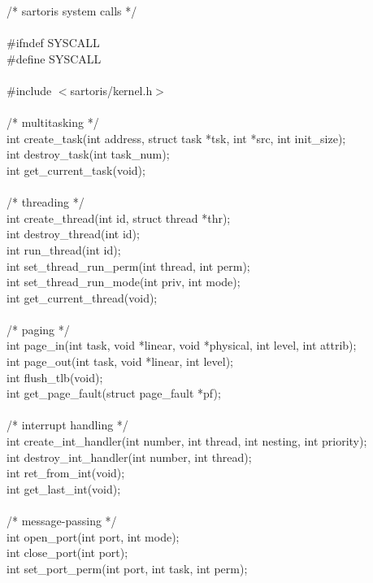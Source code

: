\documentclass[11pt, letterpaper, twoside, english]{book}
\begin{document}
\begin{sf}
\noindent /* sartoris system calls */ \\
\\
\#ifndef SYSCALL \\ 
\#define SYSCALL \\
\\
\#include $<$sartoris/kernel.h$>$ \\
\\
/* multitasking */ \\
int create\_task(int address, struct task *tsk, int *src, int init\_size); \\
int destroy\_task(int task\_num); \\
int get\_current\_task(void); \\
\\
/* threading */ \\
int create\_thread(int id, struct thread *thr); \\
int destroy\_thread(int id); \\
int run\_thread(int id); \\
int set\_thread\_run\_perm(int thread, int perm); \\
int set\_thread\_run\_mode(int priv, int mode); \\
int get\_current\_thread(void); \\
\\
/* paging */ \\
int page\_in(int task, void *linear, void *physical, int level, int attrib); \\
int page\_out(int task, void *linear, int level); \\
int flush\_tlb(void); \\
int get\_page\_fault(struct page\_fault *pf); \\
\\
/* interrupt handling */ \\
int create\_int\_handler(int number, int thread, int nesting, int priority); \\
int destroy\_int\_handler(int number, int thread); \\
int ret\_from\_int(void); \\
int get\_last\_int(void); \\
\\
/* message-passing */ \\
int open\_port(int port, int mode);\\
int close\_port(int port);\\
int set\_port\_perm(int port, int task, int perm);\\

\end{sf}
\end{document}
